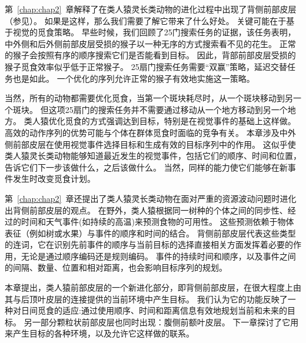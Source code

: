 第~\ref{chap:chap2}~章解释了在类人猿灵长类动物的进化过程中出现了背侧前部皮层（参见\cite{preuss2011human}）。
如果是这样，那么我们需要了解它带来了什么好处。
关键可能在于基于视觉的觅食策略。
早些时候，我们回顾了25门搜索任务的证据，该任务表明，中外侧和后外侧前部皮层受损的猴子以一种无序的方式搜索看不见的花生\cite{passingham1985memory}。
正常的猴子会按照有序的顺序搜索它们是否能看到目标\cite{desrochers2010optimal,taffe2011rhesus}。
因此，背部前部皮层受损的猴子觅食效率似乎低于正常猴子。
25扇门搜索任务需要“双赢”策略，延迟交替任务也是如此。
一个优化的序列允许正常的猴子有效地实施这一策略。


当然，所有的动物都需要优化觅食，当第一个斑块耗尽时，从一个斑块移动到另一个斑块\cite{plank2008optimal}。
但这项25扇门的搜索任务并不需要通过移动从一个地方移动到另一个地方。
类人猿优化觅食的方式强调达到目标，特别是在视觉事件的基础上这样做。
高效的动作序列的优势可能与个体在群体觅食时面临的竞争有关。
本章涉及中外侧前部皮层在使用视觉事件选择目标和生成有效的目标序列中的作用。
这似乎使类人猿灵长类动物能够知道最近发生的视觉事件，包括它们的顺序、时间和位置，告诉它们下一步该做什么，之后该做什么。
当然，同样的能力使它们能够在新事件发生时改变觅食计划。


第~\ref{chap:chap2}~章还提出了类人猿灵长类动物在面对严重的资源波动问题时进化出背侧前部皮层的观点。
在野外，类人猿根据同一树种的个体之间的同步性、经过的时间和天气事件(如持续的高温)来预测食物的可用性。
这些预测依赖于物体表征（例如树或水果）与事件的顺序和时间的结合。
背侧前部皮层代表这些类型的连词，它在识别先前事件的顺序与当前目标的选择直接相关方面发挥着必要的作用，无论是通过顺序编码还是规则编码。
事件的持续时间和顺序，以及事件之间的间隔、数量、位置和相对距离，也会影响目标序列的规划。


本章提出，类人猿前部皮层的一个新进化部分，即背侧前部皮层，在很大程度上由其与后顶叶皮层的连接提供的当前环境中产生目标。
我们认为它的功能反映了一种对日间觅食的适应:通过使用顺序、时间和距离信息有效地规划当前和未来的目标。
另一部分颗粒状前部皮层也同时出现：腹侧前额叶皮层。
下一章探讨了它用来产生目标的各种环境，以及允许它这样做的联系。

